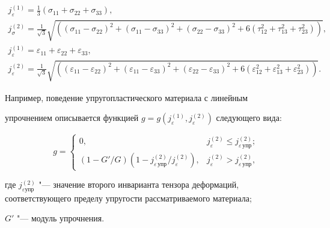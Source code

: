 \begin{gather*}

j_\varepsilon ^{(1)} =\frac{1}{3}(\sigma _{11} +\sigma _{22}

+\sigma _{33}),\\

j_\sigma^{(2)} =\frac{1}{\sqrt 3 }\sqrt {\left((\sigma _{11}

-\sigma _{22} )^2+(\sigma _{11} -\sigma _{33} )^2+(\sigma _{22}

-\sigma _{33})^2+6(\tau _{12}^2+\tau _{13}^2+\tau

_{23}^2)\right)},\\

j_\varepsilon ^{(1)} =\varepsilon _{11} +\varepsilon _{22}

+\varepsilon _{33},\\

j_\varepsilon ^{(2)} =\frac{1}{\sqrt 3 }\sqrt {\left( (\varepsilon

_{11} -\varepsilon _{22} )^2+(\varepsilon _{11} -\varepsilon _{33}

)^2+(\varepsilon _{22} -\varepsilon _{33})^2+6(\varepsilon _{12}

^2+\varepsilon _{13}^2+\varepsilon _{23} ^2) \right)}.

\end{gather*}

Например, поведение упругопластического материала с линейным

упрочнением описывается функцией $g=g(j_\varepsilon ^{(1)}, j_\varepsilon ^{(2)} )$ следующего вида:

\[

g=\begin{cases}

0, & j_\varepsilon^{(2)} \le

j_{\varepsilon\, \text{упр}}^{(2)}; \\

(1-G'/G)(1-j_{\varepsilon \,\text{упр}}^{(2)} /j_{\varepsilon}^{(2)}),&  j_\varepsilon^{( 2 )} >j_{\varepsilon \,\text{упр}}^{(2)},

\end{cases}

\]

где $j_{\varepsilon \text{упр}}^{( 2 )} $ "--- значение второго инварианта тензора деформаций, соответствующего пределу упругости рассматриваемого материала; 

$G'$ "--- модуль упрочнения.





